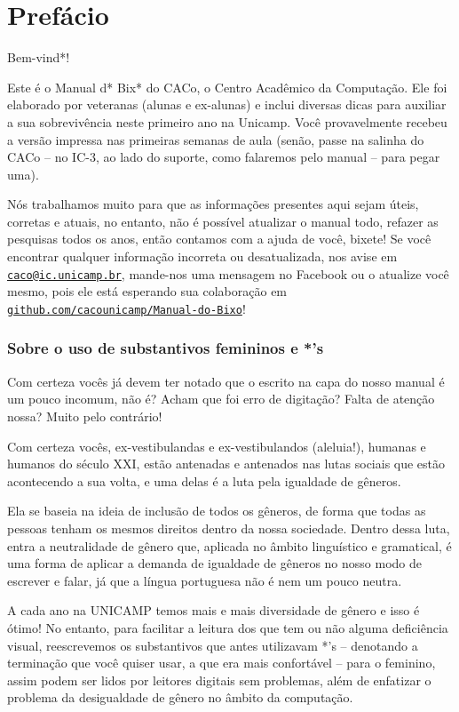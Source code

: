 \documentclass[a4paper,10pt,oldfontcommands]{memoir}
\newcommand{\email}[1]{\href{mailto:#1}{\nolinkurl{#1}}}
\renewcommand{\url}[1]{\href{http://#1}{\nolinkurl{#1}}}
\begin{document}
\chapter{Prefácio}
\setlength{\parskip}{1em}

Bem-vind*!

Este é o Manual d* Bix* do CACo, o Centro Acadêmico da Computação. Ele foi
elaborado por veteranas (alunas e ex-alunas) e inclui diversas dicas para
auxiliar a sua sobrevivência neste primeiro ano na Unicamp. Você provavelmente
recebeu a versão impressa nas primeiras semanas de aula (senão, passe na
salinha do CACo -- no IC-3, ao lado do suporte, como falaremos pelo manual --
para pegar uma).

Nós trabalhamos muito para que as informações presentes aqui sejam úteis,
corretas e atuais, no entanto, não é possível atualizar o manual todo, refazer
as pesquisas todos os anos, então contamos com a ajuda de você, bixete! Se você
encontrar qualquer informação incorreta ou desatualizada, nos avise em
\email{caco@ic.unicamp.br}, mande-nos uma mensagem no Facebook ou o atualize
você mesmo, pois ele está esperando sua colaboração em
\url{github.com/cacounicamp/Manual-do-Bixo}!

\subsection{Sobre o uso de substantivos femininos e *'s}
Com certeza vocês já devem ter notado que o escrito na capa do nosso manual é
um pouco incomum, não é?  Acham que foi erro de digitação? Falta de atenção
nossa? Muito pelo contrário!

Com certeza vocês, ex-vestibulandas e ex-vestibulandos (aleluia!), humanas e
humanos do século XXI, estão antenadas e antenados nas lutas sociais que estão
acontecendo a sua volta, e uma delas é a luta pela igualdade de gêneros.

Ela se baseia na ideia de inclusão de todos os gêneros, de forma que todas as
pessoas tenham os mesmos direitos dentro da nossa sociedade. Dentro dessa luta,
entra a neutralidade de gênero que, aplicada no âmbito linguístico e
gramatical, é uma forma de aplicar a demanda de igualdade de gêneros no nosso
modo de escrever e falar, já que a língua portuguesa não é nem um pouco neutra.

A cada ano na UNICAMP temos mais e mais diversidade de gênero e isso é ótimo!
No entanto, para facilitar a leitura dos que tem ou não alguma deficiência
visual, reescrevemos os substantivos que antes utilizavam *'s -- denotando a
terminação que você quiser usar, a que era mais confortável -- para o feminino,
assim podem ser lidos por leitores digitais sem problemas, além de enfatizar o
problema da desigualdade de gênero no âmbito da computação.
\end{document}
